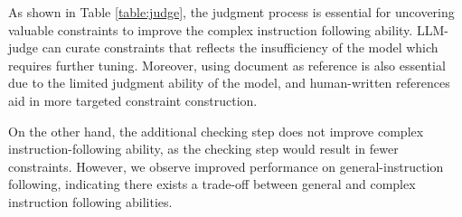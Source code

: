 As shown in Table \ref{table:judge}, the judgment process is essential for uncovering valuable constraints to improve the complex instruction following ability. LLM-judge can curate constraints that reflects the insufficiency of the model which requires further tuning. Moreover, using document as reference is also essential due to the limited judgment ability of the model, and human-written references aid in more targeted constraint construction.

On the other hand, the additional checking step does not improve complex instruction-following ability, as the checking step would result in fewer constraints. However, we observe improved performance on general-instruction following, indicating there exists a trade-off between general and complex instruction following abilities.

\begin{table}[!ht]
\centering
\renewcommand{\arraystretch}{0.95}
\caption{Experiment results on Llama-3-8B models with constraints from different judgment strategies.}
\label{table:judge}
\end{table}





